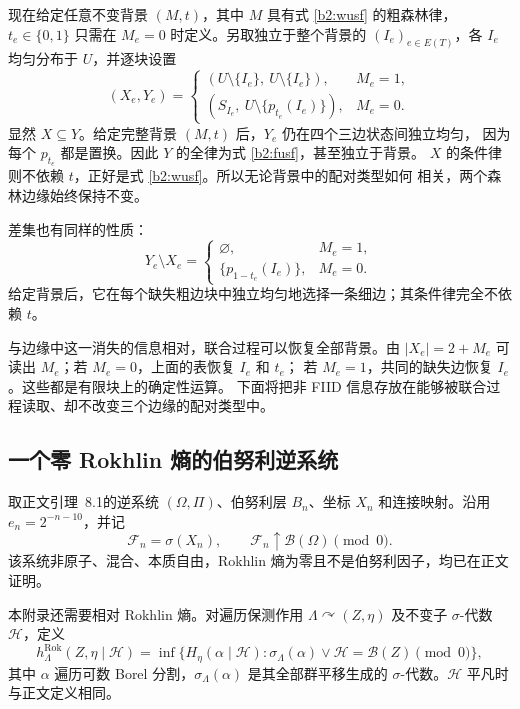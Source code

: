 \documentclass[UTF8,zihao=-4,a4paper]{ctexart}
\numberwithin{equation}{section}
\begin{document}
现在给定任意不变背景 $(M,t)$，其中 $M$ 具有式 \eqref{b2:wusf} 的粗森林律，
$t_e\in\{0,1\}$ 只需在 $M_e=0$ 时定义。另取独立于整个背景的
$(I_e)_{e\in E(T)}$，各 $I_e$ 均匀分布于 $U$，并逐块设置
\begin{equation}\label{b2:localmap}
 (X_e,Y_e)=
 \begin{cases}
 (U\setminus\{I_e\},\ U\setminus\{I_e\}),&M_e=1,\\
 (S_{I_e},\ U\setminus\{p_{t_e}(I_e)\}),&M_e=0.
 \end{cases}
\end{equation}
显然 $X\subseteq Y$。给定完整背景 $(M,t)$ 后，$Y_e$ 仍在四个三边状态间独立均匀，
因为每个 $p_{t_e}$ 都是置换。因此 $Y$ 的全律为式 \eqref{b2:fusf}，甚至独立于背景。
$X$ 的条件律则不依赖 $t$，正好是式 \eqref{b2:wusf}。所以无论背景中的配对类型如何
相关，两个森林边缘始终保持不变。

差集也有同样的性质：
\begin{equation}\label{b2:difference}
 Y_e\setminus X_e=
 \begin{cases}
 \varnothing,&M_e=1,\\
 \{p_{1-t_e}(I_e)\},&M_e=0.
 \end{cases}
\end{equation}
给定背景后，它在每个缺失粗边块中独立均匀地选择一条细边；其条件律完全不依赖 $t$。

与边缘中这一消失的信息相对，联合过程可以恢复全部背景。由
$|X_e|=2+M_e$ 可读出 $M_e$；若 $M_e=0$，上面的表恢复 $I_e$ 和 $t_e$；
若 $M_e=1$，共同的缺失边恢复 $I_e$。这些都是有限块上的确定性运算。
下面将把非 FIID 信息存放在能够被联合过程读取、却不改变三个边缘的配对类型中。

\subsection{一个零 Rokhlin 熵的伯努利逆系统}\label{b2:inverse}

取正文引理~8.1的逆系统 $(\Omega,\Pi)$、伯努利层 $B_n$、坐标 $X_n$ 和连接映射。沿用 $e_n=2^{-n-10}$，并记
\begin{equation}\label{b2:filtration}
 \mathcal F_n=\sigma(X_n),\qquad
 \mathcal F_n\uparrow\mathcal B(\Omega)\pmod0.
\end{equation}
该系统非原子、混合、本质自由，Rokhlin 熵为零且不是伯努利因子，均已在正文证明。

本附录还需要相对 Rokhlin 熵。对遍历保测作用 $\Lambda\curvearrowright(Z,\eta)$ 及不变子 $\sigma$-代数 $\mathcal H$，定义
\begin{equation}\label{b2:rokdef}
 h^{\mathrm{Rok}}_\Lambda(Z,\eta\mid\mathcal H)
 =\inf\{H_\eta(\alpha\mid\mathcal H):
       \sigma_\Lambda(\alpha)\vee\mathcal H=\mathcal B(Z)\pmod0\},
\end{equation}
其中 $\alpha$ 遍历可数 Borel 分割，$\sigma_\Lambda(\alpha)$ 是其全部群平移生成的 $\sigma$-代数。$\mathcal H$ 平凡时与正文定义相同。
\end{document}
